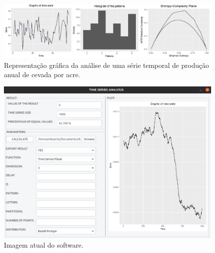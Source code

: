 \begin{figure}[H]
	\centering
	\includegraphics[width=1\columnwidth]{capitulos/imagens/rplot}        
    \caption{Representação gráfica da análise de uma série temporal de produção anual de cevada por acre.}
\end{figure}
 
\begin{figure}[H]
	\centering
	\includegraphics[width=0.95\columnwidth]{capitulos/imagens/SoftwareNow.jpg}   
    \caption{Imagem atual do software.}
    \vspace{6cm}
\end{figure}


